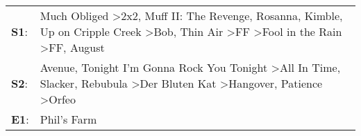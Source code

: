 \begin{supertabular}{p{0.03\textwidth}p{0.92\textwidth}}
 \textbf{S1}:  &  Much Obliged\textsuperscript{} \textgreater \enspace 2x2\textsuperscript{}, \enspace Muff II: The Revenge\textsuperscript{}, \enspace Rosanna\textsuperscript{}, \enspace Kimble\textsuperscript{}, \enspace Up on Cripple Creek\textsuperscript{} \textgreater \enspace Bob\textsuperscript{}, \enspace Thin Air\textsuperscript{} \textgreater \enspace FF\textsuperscript{} \textgreater \enspace Fool in the Rain\textsuperscript{} \textgreater \enspace FF\textsuperscript{}, \enspace August\textsuperscript{}  \enspace  \\
 \textbf{S2}:  &                                                                                                        Avenue\textsuperscript{}, \enspace Tonight I'm Gonna Rock You Tonight\textsuperscript{} \textgreater \enspace All In Time\textsuperscript{}, \enspace Slacker\textsuperscript{}, \enspace Rebubula\textsuperscript{} \textgreater \enspace Der Bluten Kat\textsuperscript{} \textgreater \enspace Hangover\textsuperscript{}, \enspace Patience\textsuperscript{} \textgreater \enspace Orfeo\textsuperscript{}  \enspace  \\
 \textbf{E1}:  &                                                                                                                                                                                                                                                                                                                                                                                                                                                                                          Phil's Farm\textsuperscript{}  \enspace  \\
\end{supertabular}
